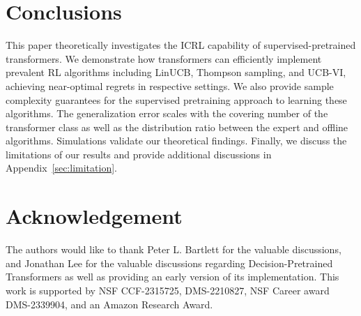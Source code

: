 \documentclass[10pt]{article}
\newcommand{\<}{\left\langle}
\renewcommand{\>}{\right\rangle}
\begin{document}
\section{Conclusions}

This paper theoretically investigates the ICRL capability of supervised-pretrained transformers. We demonstrate how transformers can efficiently implement prevalent RL algorithms including LinUCB, Thompson sampling, and UCB-VI, achieving near-optimal regrets in respective settings. We also provide sample complexity guarantees for the supervised pretraining approach to learning these algorithms. The generalization error scales with the covering number of the transformer class as well as the distribution ratio between the expert and offline algorithms. Simulations validate our theoretical findings.  
Finally, we discuss the limitations of our results and provide additional discussions in Appendix~\ref{sec:limitation}.





\section*{Acknowledgement}

The authors would like to thank Peter L. Bartlett for the valuable discussions, and Jonathan Lee for the valuable discussions regarding Decision-Pretrained Transformers as well as providing an early version of its implementation. This work is supported by NSF CCF-2315725, DMS-2210827, NSF Career award DMS-2339904, and an Amazon Research Award.


\end{document}

